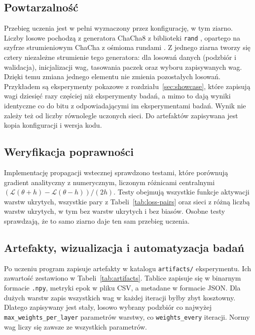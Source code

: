 \subsection{Powtarzalność}
\label{sec:implementation-reproducibility}

Przebieg uczenia jest w pełni wyznaczony przez konfigurację, w tym ziarno. Liczby losowe pochodzą z generatora ChaCha8 z biblioteki \texttt{rand} \cite{rand}, opartego na szyfrze strumieniowym ChaCha z ośmioma rundami \cite{bernstein2008}. Z jednego ziarna tworzy się cztery niezależne strumienie tego generatora: dla losowań danych (podzbiór i walidacja), inicjalizacji wag, tasowania paczek oraz wyboru zapisywanych wag. Dzięki temu zmiana jednego elementu nie zmienia pozostałych losowań. Przykładem są eksperymenty pokazowe z rozdziału~\ref{sec:showcase}, które zapisują wagi dziesięć razy częściej niż eksperymenty badań, a mimo to dają wyniki identyczne co do bitu z odpowiadającymi im eksperymentami badań. Wynik nie zależy też od liczby równolegle uczonych sieci. Do artefaktów zapisywana jest kopia konfiguracji i wersja kodu.

\subsection{Weryfikacja poprawności}
\label{sec:implementation-verification}

Implementację propagacji wstecznej sprawdzono testami, które porównują gradient analityczny z numerycznym, liczonym różnicami centralnymi $(\mathcal{L}(\theta + h) - \mathcal{L}(\theta - h)) / (2h)$. Testy obejmują wszystkie funkcje aktywacji warstw ukrytych, wszystkie pary z Tabeli~\ref{tab:loss-pairs} oraz sieci z różną liczbą warstw ukrytych, w tym bez warstw ukrytych i bez biasów. Osobne testy sprawdzają, że to samo ziarno daje ten sam przebieg uczenia.

\subsection{Artefakty, wizualizacja i automatyzacja badań}
\label{sec:implementation-analysis}

Po uczeniu program zapisuje artefakty w katalogu \texttt{artifacts/} eksperymentu. Ich zawartość zestawiono w Tabeli~\ref{tab:artifacts}. Tablice zapisuje się w binarnym formacie \texttt{.npy}, metryki epok w pliku CSV, a metadane w formacie JSON. Dla dużych warstw zapis wszystkich wag w każdej iteracji byłby zbyt kosztowny. Dlatego zapisywany jest stały, losowo wybrany podzbiór co najwyżej \texttt{max\_weights\_per\_layer} parametrów warstwy, co \texttt{weights\_every} iteracji. Normy wag liczy się zawsze ze wszystkich parametrów.

